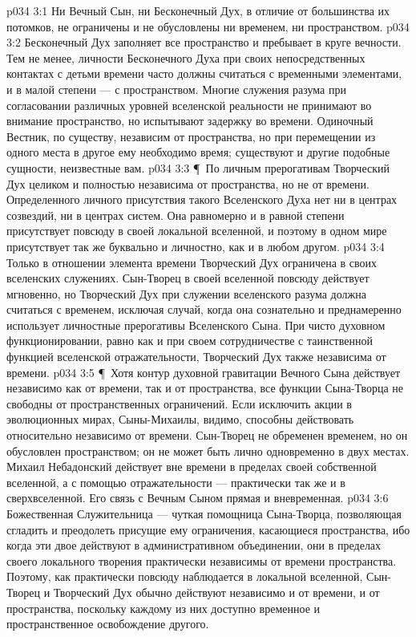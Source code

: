 \vs p034 3:1 Ни Вечный Сын, ни Бесконечный Дух, в отличие от большинства их потомков, не ограничены и не обусловлены ни временем, ни пространством.
\vs p034 3:2 Бесконечный Дух заполняет все пространство и пребывает в круге вечности. Тем не менее, личности Бесконечного Духа при своих непосредственных контактах с детьми времени часто должны считаться с временными элементами, и в малой степени --- с пространством. Многие служения разума при согласовании различных уровней вселенской реальности не принимают во внимание пространство, но испытывают задержку во времени. Одиночный Вестник, по существу, независим от пространства, но при перемещении из одного места в другое ему необходимо время; существуют и другие подобные сущности, неизвестные вам.
\vs p034 3:3 \P\ По личным прерогативам Творческий Дух целиком и полностью независима от пространства, но не от времени. Определенного личного присутствия такого Вселенского Духа нет ни в центрах созвездий, ни в центрах систем. Она равномерно и в равной степени присутствует повсюду в своей локальной вселенной, и поэтому в одном мире присутствует так же буквально и личностно, как и в любом другом.
\vs p034 3:4 Только в отношении элемента времени Творческий Дух ограничена в своих вселенских служениях. Сын\hyp{}Творец в своей вселенной повсюду действует мгновенно, но Творческий Дух при служении вселенского разума должна считаться с временем, исключая случай, когда она сознательно и преднамеренно использует личностные прерогативы Вселенского Сына. При чисто духовном функционировании, равно как и при своем сотрудничестве с таинственной функцией вселенской отражательности, Творческий Дух также независима от времени.
\vs p034 3:5 \P\ Хотя контур духовной гравитации Вечного Сына действует независимо как от времени, так и от пространства, все функции Сына\hyp{}Творца не свободны от пространственных ограничений. Если исключить акции в эволюционных мирах, Сыны\hyp{}Михаилы, видимо, способны действовать относительно независимо от времени. Сын\hyp{}Творец не обременен временем, но он обусловлен пространством; он не может быть лично одновременно в двух местах. Михаил Небадонский действует вне времени в пределах своей собственной вселенной, а с помощью отражательности --- практически так же и в сверхвселенной. Его связь с Вечным Сыном прямая и вневременная.
\vs p034 3:6 Божественная Служительница --- чуткая помощница Сына\hyp{}Творца, позволяющая сгладить и преодолеть присущие ему ограничения, касающиеся пространства, ибо когда эти двое действуют в административном объединении, они в пределах своего локального творения практически независимы от времени  пространства. Поэтому, как практически повсюду наблюдается в локальной вселенной, Сын\hyp{}Творец и Творческий Дух обычно действуют независимо и от времени, и от пространства, поскольку каждому из них доступно временное и пространственное освобождение другого.
